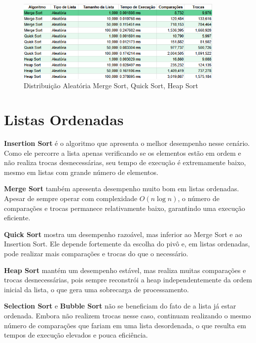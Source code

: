 \documentclass[12pt, a4paper]{report}
\begin{document}
\begin{figure}[H]
    \centering
    \includegraphics[width=0.9\textwidth]{listas/aleatoriom.png}
    \caption{Distribuição Aleatória Merge Sort, Quick Sort, Heap Sort}
    \label{fig:aleatoriom}
\end{figure}

\section{Listas Ordenadas}
	\textbf{Insertion Sort} é o algoritmo que apresenta o melhor desempenho nesse cenário. Como ele percorre a lista apenas verificando se os elementos estão em ordem e não realiza trocas desnecessárias, seu tempo de execução é extremamente baixo, mesmo em listas com grande número de elementos.

\textbf{Merge Sort} também apresenta desempenho muito bom em listas ordenadas. Apesar de sempre operar com complexidade $O(n \log n)$, o número de comparações e trocas permanece relativamente baixo, garantindo uma execução eficiente.

 \textbf{Quick Sort} mostra um desempenho razoável, mas inferior ao Merge Sort e ao Insertion Sort. Ele depende fortemente da escolha do pivô e, em listas ordenadas, pode realizar mais comparações e trocas do que o necessário.

\textbf{Heap Sort} mantém um desempenho estável, mas realiza muitas comparações e trocas desnecessárias, pois sempre reconstrói a heap independentemente da ordem inicial da lista, o que gera uma sobrecarga de processamento.

\textbf{Selection Sort} e \textbf{Bubble Sort} não se beneficiam do fato de a lista já estar ordenada. Embora não realizem trocas nesse caso, continuam realizando o mesmo número de comparações que fariam em uma lista desordenada, o que resulta em tempos de execução elevados e pouca eficiência.
\end{document}
